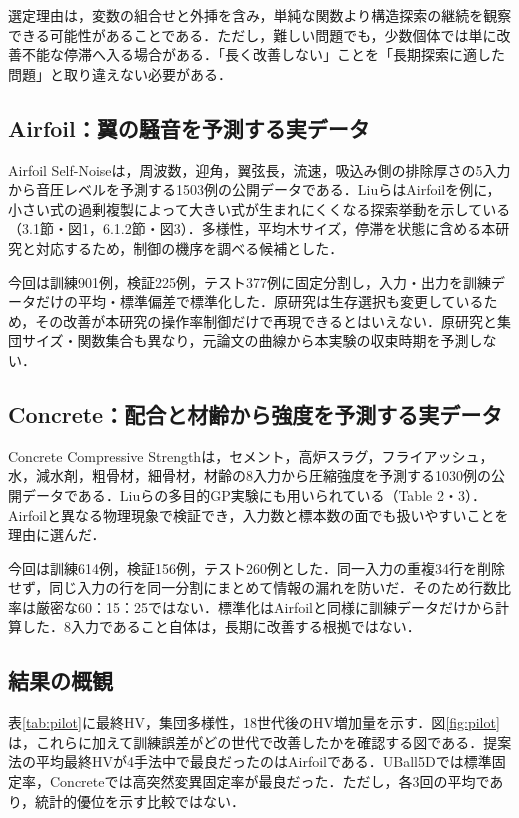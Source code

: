 \documentclass[a4paper,10pt,twocolumn]{ltjsarticle}
\begin{document}
選定理由は，変数の組合せと外挿を含み，単純な関数より構造探索の継続を観察できる可能性があることである．ただし，難しい問題でも，少数個体では単に改善不能な停滞へ入る場合がある．「長く改善しない」ことを「長期探索に適した問題」と取り違えない必要がある．

\subsection{Airfoil：翼の騒音を予測する実データ}
Airfoil Self-Noiseは，周波数，迎角，翼弦長，流速，吸込み側の排除厚さの5入力から音圧レベルを予測する1503例の公開データである\cite{airfoil}．LiuらはAirfoilを例に，小さい式の過剰複製によって大きい式が生まれにくくなる探索挙動を示している（3.1節・図1，6.1.2節・図3）\cite{liu2022}．多様性，平均木サイズ，停滞を状態に含める本研究と対応するため，制御の機序を調べる候補とした．

今回は訓練901例，検証225例，テスト377例に固定分割し，入力・出力を訓練データだけの平均・標準偏差で標準化した．原研究は生存選択も変更しているため，その改善が本研究の操作率制御だけで再現できるとはいえない．原研究と集団サイズ・関数集合も異なり，元論文の曲線から本実験の収束時期を予測しない．

\subsection{Concrete：配合と材齢から強度を予測する実データ}
Concrete Compressive Strengthは，セメント，高炉スラグ，フライアッシュ，水，減水剤，粗骨材，細骨材，材齢の8入力から圧縮強度を予測する1030例の公開データである\cite{concrete}．Liuらの多目的GP実験にも用いられている（Table 2・3）\cite{liu2022}．Airfoilと異なる物理現象で検証でき，入力数と標本数の面でも扱いやすいことを理由に選んだ．

今回は訓練614例，検証156例，テスト260例とした．同一入力の重複34行を削除せず，同じ入力の行を同一分割にまとめて情報の漏れを防いだ．そのため行数比率は厳密な60：15：25ではない．標準化はAirfoilと同様に訓練データだけから計算した．8入力であること自体は，長期に改善する根拠ではない．

\subsection{結果の概観}
表\ref{tab:pilot}に最終HV，集団多様性，18世代後のHV増加量を示す．図\ref{fig:pilot}は，これらに加えて訓練誤差がどの世代で改善したかを確認する図である．提案法の平均最終HVが4手法中で最良だったのはAirfoilである．UBall5Dでは標準固定率，Concreteでは高突然変異固定率が最良だった．ただし，各3回の平均であり，統計的優位を示す比較ではない．
\end{document}

